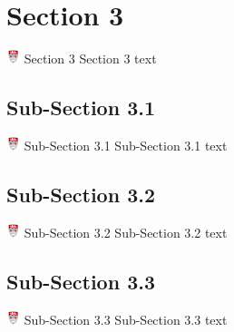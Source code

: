 \documentclass{beamer}
\begin{document}
\section{Section 3}
	\begin{frame}{\includegraphics[height=0.4cm,width=0.4cm,keepaspectratio]{CrestTrans.png}
		Section 3}
		Section 3 text
	\end{frame}
\subsection{Sub-Section 3.1}
	\begin{frame}{\includegraphics[height=0.4cm,width=0.4cm,keepaspectratio]{CrestTrans.png}
		Sub-Section 3.1}
		Sub-Section 3.1 text
	\end{frame}
\subsection{Sub-Section 3.2}
	\begin{frame}{\includegraphics[height=0.4cm,width=0.4cm,keepaspectratio]{CrestTrans.png}
		Sub-Section 3.2}
		Sub-Section 3.2 text
	\end{frame}
\subsection{Sub-Section 3.3}
	\begin{frame}{\includegraphics[height=0.4cm,width=0.4cm,keepaspectratio]{CrestTrans.png}
		Sub-Section 3.3}
		Sub-Section 3.3 text
	\end{frame}
\end{document}
